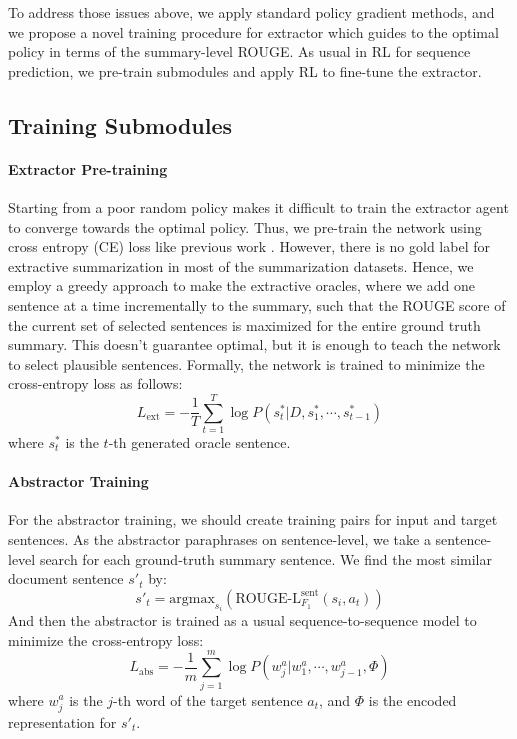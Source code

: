 \documentclass[11pt,a4paper]{article}
\begin{document}
To address those issues above, we apply standard policy gradient methods,
and we propose a novel training procedure for extractor
which guides to the optimal policy in terms of the summary-level ROUGE. As usual in RL for sequence prediction,
we pre-train submodules and apply RL to fine-tune the extractor.

\subsection{Training Submodules}
\label{sec:submodule}

\paragraph{Extractor Pre-training}

Starting from a poor random policy makes it difficult to
train the extractor agent to converge towards the optimal policy.
Thus, we pre-train the network using cross entropy (CE) loss
like previous work \cite{DBLP:conf/iclr/BahdanauBXGLPCB17, chen-bansal-2018-fast}.
However, there is no gold label for extractive summarization
in most of the summarization datasets.
Hence, we employ a greedy approach \cite{nallapati2017summarunner}
to make the extractive oracles,
where we add one sentence at a time incrementally to the summary,
such that the ROUGE score of the current set of selected sentences
is maximized for the entire ground truth summary.
This doesn't guarantee optimal, but it is enough
to teach the network to select plausible sentences.
Formally, the network is trained to minimize
the cross-entropy loss as follows:
\begin{equation}
\label{eq:}
L_{\text{ext}}=-\frac{1}{T}\sum_{t=1}^{T}\log P(s^*_t|D,s^*_1,\cdots,s^*_{t-1})
\end{equation}
where $s^*_t$ is the $t$-th generated oracle sentence.

\paragraph{Abstractor Training}

For the abstractor training, we should create
training pairs for input and target sentences.
As the abstractor paraphrases on sentence-level,
we take a sentence-level search for each ground-truth
summary sentence. We find the most similar document
sentence $s'_t$ by:
\begin{equation}
\label{eq:}
s'_t = \text{argmax}_{s_i}(\text{ROUGE-L}^{\text{sent}}_{F_1}(s_i,a_t))
\end{equation}
And then the abstractor is trained as a usual sequence-to-sequence
model to minimize  the cross-entropy loss:
\begin{equation}
\label{eq:}
L_{\text{abs}}=-\frac{1}{m}\sum_{j=1}^m\log P(w^a_j|w^a_1,\cdots,w^a_{j-1},\Phi)
\end{equation}
where $w^a_j$ is the $j$-th word of the target sentence $a_t$,
and $\Phi$ is the encoded representation for $s'_t$.
\end{document}
